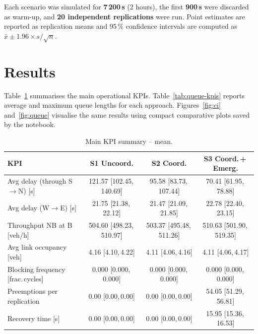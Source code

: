 \documentclass[11pt,a4paper]{article}
\begin{document}
Each scenario was simulated for \textbf{7\,200\,s} (2 hours), the first \textbf{900\,s} were discarded as warm-up, and \textbf{20 independent replications} were run. Point estimates are reported as replication means and 95\,\% confidence intervals are computed as $\bar{x} \pm 1.96 \times s / \sqrt{n}$.

\section{Results}
\label{sec:results}

Table~\ref{tab:main-kpis} summarises the main operational KPIs. Table~\ref{tab:queue-kpis} reports average and maximum queue lengths for each approach. Figures~\ref{fig:ci} and~\ref{fig:queue} visualise the same results using compact comparative plots saved by the notebook.

\begin{table}[H]
\centering
\caption{Main KPI summary -- mean\;[95\,\% CI].}
\label{tab:main-kpis}
\small
{}
\begin{tabular}{>{\raggedright\arraybackslash}p{4.5cm} c c c}
\toprule
\rowcolor{TableHead}
\textbf{KPI} & \textbf{S1 Uncoord.} & \textbf{S2 Coord.} & \textbf{S3 Coord.\,+\,Emerg.} \\
\midrule
Avg delay (through S$\rightarrow$N) [s]
  & 121.57 \scriptsize[102.45,\,140.69]
  & 95.58  \scriptsize[83.73,\,107.44]
  & 70.41  \scriptsize[61.95,\,78.88] \\
Avg delay (W$\rightarrow$E) [s]
  & 21.75  \scriptsize[21.38,\,22.12]
  & 21.47  \scriptsize[21.09,\,21.85]
  & 22.78  \scriptsize[22.40,\,23.15] \\
Throughput NB at B [veh/h]
  & 504.60 \scriptsize[498.23,\,510.97]
  & 503.37 \scriptsize[495.48,\,511.26]
  & 510.63 \scriptsize[501.90,\,519.35] \\
Avg link occupancy [veh]
  & 4.16   \scriptsize[4.10,\,4.22]
  & 4.11   \scriptsize[4.06,\,4.16]
  & 4.11   \scriptsize[4.06,\,4.17] \\
Blocking frequency [frac.\,cycles]
  & 0.000  \scriptsize[0.000,\,0.000]
  & 0.000  \scriptsize[0.000,\,0.000]
  & 0.000  \scriptsize[0.000,\,0.000] \\
Preemptions per replication
  & 0.00   \scriptsize[0.00,\,0.00]
  & 0.00   \scriptsize[0.00,\,0.00]
  & 54.05  \scriptsize[51.29,\,56.81] \\
Recovery time [s]
  & 0.00   \scriptsize[0.00,\,0.00]
  & 0.00   \scriptsize[0.00,\,0.00]
  & 15.95  \scriptsize[15.36,\,16.53] \\
\bottomrule
\end{tabular}
\end{table}
\end{document}
